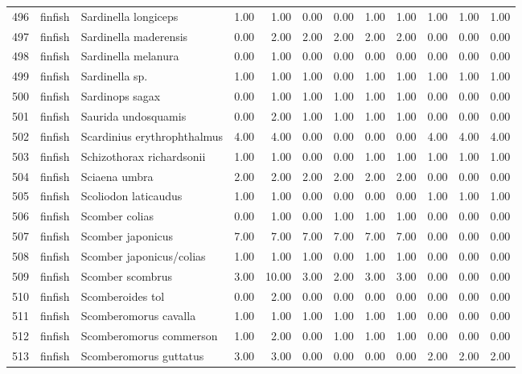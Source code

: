 \begin{table}[ht]
\begin{tabular}{rllrrrrrrrrr}
  496 & finfish & Sardinella longiceps & 1.00 & 1.00 & 0.00 & 0.00 & 1.00 & 1.00 & 1.00 & 1.00 & 1.00 \\ 
  497 & finfish & Sardinella maderensis & 0.00 & 2.00 & 2.00 & 2.00 & 2.00 & 2.00 & 0.00 & 0.00 & 0.00 \\ 
  498 & finfish & Sardinella melanura & 0.00 & 1.00 & 0.00 & 0.00 & 0.00 & 0.00 & 0.00 & 0.00 & 0.00 \\ 
  499 & finfish & Sardinella sp. & 1.00 & 1.00 & 1.00 & 0.00 & 1.00 & 1.00 & 1.00 & 1.00 & 1.00 \\ 
  500 & finfish & Sardinops sagax & 0.00 & 1.00 & 1.00 & 1.00 & 1.00 & 1.00 & 0.00 & 0.00 & 0.00 \\ 
  501 & finfish & Saurida undosquamis & 0.00 & 2.00 & 1.00 & 1.00 & 1.00 & 1.00 & 0.00 & 0.00 & 0.00 \\ 
  502 & finfish & Scardinius erythrophthalmus & 4.00 & 4.00 & 0.00 & 0.00 & 0.00 & 0.00 & 4.00 & 4.00 & 4.00 \\ 
  503 & finfish & Schizothorax richardsonii & 1.00 & 1.00 & 0.00 & 0.00 & 1.00 & 1.00 & 1.00 & 1.00 & 1.00 \\ 
  504 & finfish & Sciaena umbra & 2.00 & 2.00 & 2.00 & 2.00 & 2.00 & 2.00 & 0.00 & 0.00 & 0.00 \\ 
  505 & finfish & Scoliodon laticaudus & 1.00 & 1.00 & 0.00 & 0.00 & 0.00 & 0.00 & 1.00 & 1.00 & 1.00 \\ 
  506 & finfish & Scomber colias & 0.00 & 1.00 & 0.00 & 1.00 & 1.00 & 1.00 & 0.00 & 0.00 & 0.00 \\ 
  507 & finfish & Scomber japonicus & 7.00 & 7.00 & 7.00 & 7.00 & 7.00 & 7.00 & 0.00 & 0.00 & 0.00 \\ 
  508 & finfish & Scomber japonicus/colias & 1.00 & 1.00 & 1.00 & 0.00 & 1.00 & 1.00 & 0.00 & 0.00 & 0.00 \\ 
  509 & finfish & Scomber scombrus & 3.00 & 10.00 & 3.00 & 2.00 & 3.00 & 3.00 & 0.00 & 0.00 & 0.00 \\ 
  510 & finfish & Scomberoides tol & 0.00 & 2.00 & 0.00 & 0.00 & 0.00 & 0.00 & 0.00 & 0.00 & 0.00 \\ 
  511 & finfish & Scomberomorus cavalla & 1.00 & 1.00 & 1.00 & 1.00 & 1.00 & 1.00 & 0.00 & 0.00 & 0.00 \\ 
  512 & finfish & Scomberomorus commerson & 1.00 & 2.00 & 0.00 & 1.00 & 1.00 & 1.00 & 0.00 & 0.00 & 0.00 \\ 
  513 & finfish & Scomberomorus guttatus & 3.00 & 3.00 & 0.00 & 0.00 & 0.00 & 0.00 & 2.00 & 2.00 & 2.00 \\ 

\end{tabular}
\end{table}
